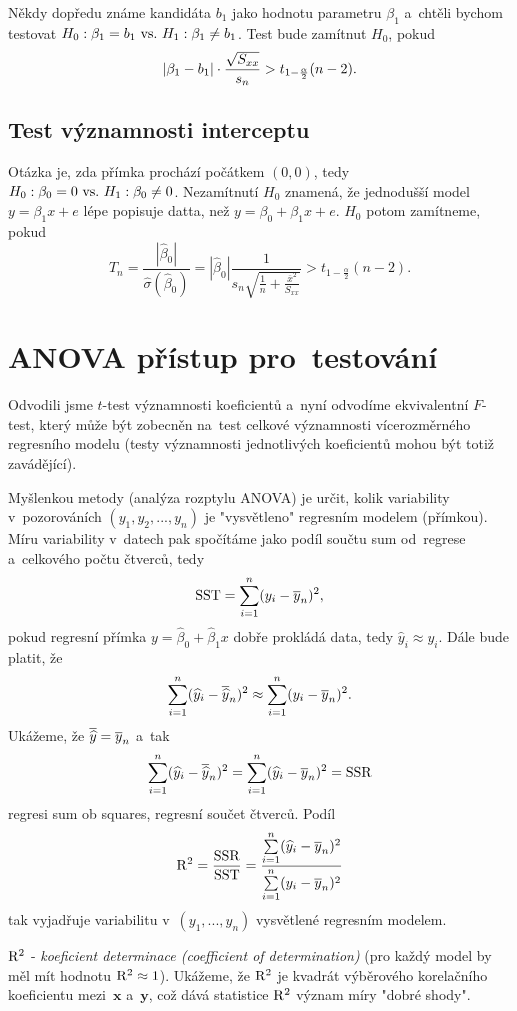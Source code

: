 \begin{remark}
	Někdy dopředu známe kandidáta $b_1$ jako hodnotu parametru $\beta_1$ a~chtěli bychom testovat 
	$H_0: \beta_1=b_1 ~\text{vs.}~ H_1: \beta_1\neq b_1$. Test bude zamítnut $H_0$, pokud 
	$$ \left|\beta_1-b_1\right|\cdot \frac{\sqrt{S_{xx}}}{s_n}> t_{1-\frac{\alpha}{2}}(n-2). $$
\end{remark}
\subsection{Test významnosti interceptu}
Otázka je, zda přímka prochází počátkem $(0,0)$, tedy $H_0: \beta_0=0 ~\text{vs.}~ H_1: \beta_0\neq0$. Nezamítnutí $H_0$ znamená, že jednodušší model $y=\beta_1 x+e$ lépe popisuje datta, než $y=\beta_0+\beta_1 x+e$. $H_0$ potom zamítneme, pokud
$$ T_n=\frac{|\widehat{\beta}_0|}{\widehat{\sigma}(\widehat{\beta}_0)}=|\widehat{\beta}_0|\frac{1}{s_n\sqrt{\frac{1}{n}+\frac{\overline{x}^2}{S_{xx}}}}>t_{1-\frac{\alpha}{2}}(n-2). $$

\section{ANOVA přístup pro~testování}
Odvodili jsme $t$-test významnosti koeficientů a~nyní odvodíme ekvivalentní $F$-test, který může být zobecněn na~test celkové významnosti vícerozměrného regresního modelu (testy významnosti jednotlivých koeficientů mohou být totiž zavádějící). 

Myšlenkou metody (analýza rozptylu ANOVA) je určit, kolik variability v~pozorováních $(y_1,y_2,...,y_n)$ je "vysvětleno" regresním modelem (přímkou). Míru variability v~datech pak spočítáme jako podíl součtu sum od~regrese a~celkového počtu čtverců, tedy
$$ \mathrm{SST}=\sum_{i=1}^{n}(y_i-\overline{y}_n)^2, $$
pokud regresní přímka $y=\widehat{\beta}_0+\widehat{\beta}_1 x$ dobře prokládá data, tedy $\widehat{y}_i\approx y_i$. Dále bude platit, že 
$$ \sum\limits_{i=1}^{n} (\widehat{y}_i-\overline{\widehat{y}}_n)^2\approx\sum\limits_{i=1}^{n} (y_i-\overline{y}_n)^2. $$
Ukážeme, že $\overline{\widehat{y}}=\overline{y}_n$ a~tak 
$$ \sum\limits_{i=1}^{n}(\widehat{y}_i-\overline{\widehat{y}}_n)^2=\sum\limits_{i=1}^{n} (\widehat{y}_i-\overline{y}_n)^2=\mathrm{SSR} $$ regresi sum ob squares, regresní součet čtverců. Podíl
$$ \mathrm{R}^2=\frac{\mathrm{SSR}}{\mathrm{SST}}=\frac{\sum\limits_{i=1}^{n} (\widehat{y}_i-\overline{y}_n)^2}{\sum\limits_{i=1}^{n} (y_i-\overline{y}_n)^2}$$ tak vyjadřuje variabilitu v~$(y_1,...,y_n)$ vysvětlené regresním modelem. 

$\mathrm{R}^2$ - \textit{koeficient determinace (coefficient of determination)} (pro každý model by měl mít hodnotu $\mathrm{R}^2\approx 1$). Ukážeme, že $\mathrm{R}^2$ je kvadrát výběrového korelačního koeficientu mezi~$\textbf{x}$ a~$\textbf{y}$, což dává statistice $\mathrm{R}^2$ význam míry "dobré shody". 

